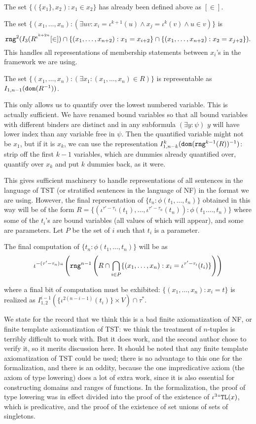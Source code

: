 \documentclass[112pt]{article}
\theoremstyle{definition}
\theoremstyle{remark}
\begin{document}
The set $\{(\{x_1\},x_2):x_1 \in x_2\}$ has already been defined above as $[\in]$.

The set $\{(x_1,\ldots,x_n):(\exists uv:x_i = \iota^{k+1}(u) \wedge x_j = \iota^k(v) \wedge u\in v)\}$ is
$${\tt rng}^2(I_3(R^{\iota^{k+2n}}[\in]) \cap \{(x_1,\ldots,x_{n+2}):x_1 = x_{i+2}\} \cap \{(x_1,\ldots,x_{n+2}):x_2=x_{j+2}\}).$$   This
handles all representations of membership statements between $x_i$'s  in the framework we are using.

The set $\{(x_1,\ldots,x_n):(\exists x_1:(x_1,\ldots,x_n)\in R)\}$ is representable as $I_{1,n-1}({\tt dom}(R^{-1}))$.

This only allows us to quantify over the lowest numbered variable.  This is actually sufficient.  We have renamed bound variables so that all bound variables with different binders are distinct
and in any subformula $(\exists y:\psi)$ $y$ will have lower index than any variable  free in $\psi$.  Then the quantified variable might not be $x_1$, but if it is $x_k$,
we can use the representation $I^{k}_{1,n-k}({\tt dom}({\tt rng}^{k-1}(R))^{-1})$:  strip off the first $k-1$ variables, which are dummies already quantified over,
quantify over $x_k$ and put $k$ dummies back, as it were.

This gives sufficient machinery to handle representations of all sentences in the language of TST (or stratified sentences in the language of NF) in the format we are using.  However, the final representation of  $\{t_n:\phi(t_1,\ldots,t_n)\}$ obtained in this way
will be of the form $R=\{(\iota^{\tau'-\tau_1}(t_1),\ldots,\iota^{\tau'-\tau_n}(t_n)):\phi(t_1.\ldots,t_n)\}$
where some of the $t_i$'s are bound variables (all values of which will appear), and some are parameters.  Let $P$ be the set  of $i$ such that
$t_i$ is a parameter.

The final computation of $\{t_n:\phi(t_1,\ldots,t_n)\}$ will be as
$$\iota^{-(\tau'-\tau_{n})}``\left({\tt rng}^{n-1}\left(R \cap \bigcap_{i \in P}\{(x_1,\ldots,x_n):x_i = \iota^{\tau'-\tau_i}(t_i)\}\right)\right)$$



where a final bit of computation must be exhibited:  $\{(x_1,\ldots,x_n):x_i = t\}$ is realized as
$I^{i-1}_{1,2}(\{\iota^{2(n-i-1)}(t_i)\}\times V)\cap \tau^*.$

We state for the record that we think this is a bad finite axiomatization of NF, or finite template axiomatization of TST:  we think the treatment of $n$-tuples is terribly difficult to work with.  But it does work, and the second author chose to verify it, so it merits discussion here.  It should be noted that any finite template axiomatization of TST could be used;  there is no advantage to this one for the formalization, and there is an oddity, because the one impredicative axiom (the axiom of type lowering) does a lot of extra work, since it is also essential for constructing domains and ranges of functions.  In the formalization, the proof of type lowering was in effect divided into the proof of the existence of $\iota^3``{\tt TL}(x)$, which is predicative, and the proof of the existence of set unions of sets of singletons.
\end{document}
